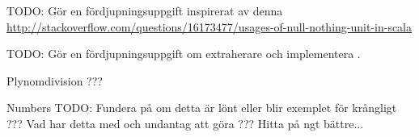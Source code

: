 \AdvancedTasks %

\Task TODO: Gör en fördjupningsuppgift inspirerat av denna \url{http://stackoverflow.com/questions/16173477/usages-of-null-nothing-unit-in-scala}    
    
\Task \label{unapply} TODO: Gör en fördjupningsuppgift om extraherare  och implementera .    
    
    
\Task Plynomdivision ???

\Task Numbers  TODO: Fundera på om detta är lönt eller blir exemplet för krångligt ??? Vad har detta med  och undantag att göra ??? Hitta på ngt bättre...


